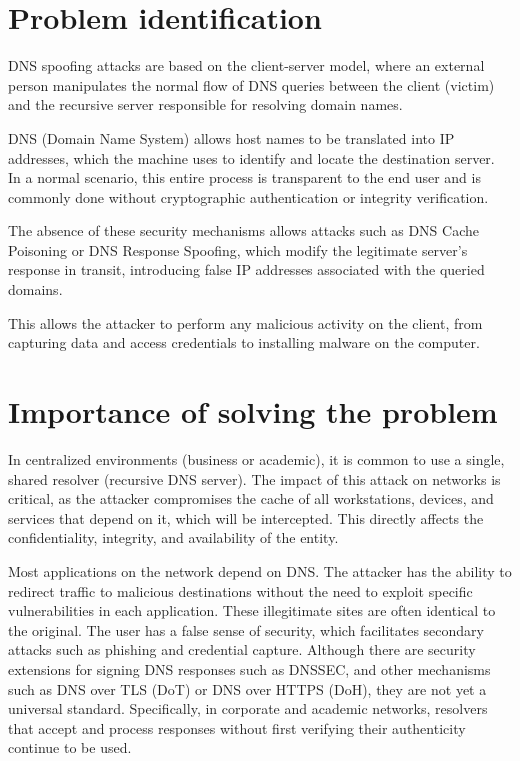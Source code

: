 \documentclass[conference]{IEEEtran}
\begin{document}
\section{Problem identification}
DNS spoofing attacks are based on the client-server model, where an external person manipulates the normal flow of DNS queries between the client (victim) and the recursive server responsible for resolving domain names.

DNS (Domain Name System) allows host names to be translated into IP addresses, which the machine uses to identify and locate the destination server. In a normal scenario, this entire process is transparent to the end user and is commonly done without cryptographic authentication or integrity verification.

The absence of these security mechanisms allows attacks such as DNS Cache Poisoning or DNS Response Spoofing, which modify the legitimate server's response in transit, introducing false IP addresses associated with the queried domains.

This allows the attacker to perform any malicious activity on the client, from capturing data and access credentials to installing malware on the computer.

\section{Importance of solving the problem}
In centralized environments (business or academic), it is common to use a single, shared resolver (recursive DNS server). The impact of this attack on networks is critical, as the attacker compromises the cache of all workstations, devices, and services that depend on it, which will be intercepted. This directly affects the confidentiality, integrity, and availability of the entity.

Most applications on the network depend on DNS. The attacker has the ability to redirect traffic to malicious destinations without the need to exploit specific vulnerabilities in each application. These illegitimate sites are often identical to the original. The user has a false sense of security, which facilitates secondary attacks such as phishing and credential capture. Although there are security extensions for signing DNS responses such as DNSSEC, and other mechanisms such as DNS over TLS (DoT) or DNS over HTTPS (DoH), they are not yet a universal standard. Specifically, in corporate and academic networks, resolvers that accept and process responses without first verifying their authenticity continue to be used.
\end{document}
